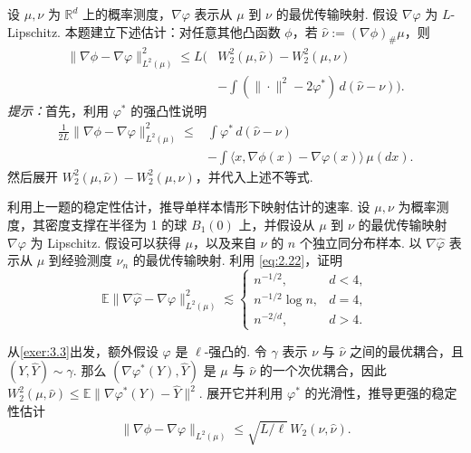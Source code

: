 \begin{exercise}\label{exer:3.3}
设 $\mu,\nu$ 为 $\mathbb R^d$ 上的概率测度，$\nabla\varphi$ 表示从 $\mu$ 到 $\nu$ 的最优传输映射. 假设 $\nabla\varphi$ 为 $L$-Lipschitz. 本题建立下述估计：对任意其他凸函数 $\phi$，若 $\widehat\nu:=(\nabla\phi)_\#\mu$，则
$$\begin{aligned}
\|\nabla\phi-\nabla\varphi\|_{L^2(\mu)}^2
\le L\biggl(&W_2^2(\mu,\widehat\nu)-W_2^2(\mu,\nu)\\
&-\int(\|\cdot\|^2-2\varphi^*)\,d(\widehat\nu-\nu)\biggr).
\end{aligned}$$
\emph{提示：}首先，利用 $\varphi^*$ 的强凸性说明
$$\begin{aligned}
\frac1{2L}\|\nabla\phi-\nabla\varphi\|_{L^2(\mu)}^2
\le{}&\int\varphi^*\,d(\widehat\nu-\nu)\\
&-\int\langle x,\nabla\phi(x)-\nabla\varphi(x)\rangle\,\mu(dx).
\end{aligned}$$
然后展开 $W_2^2(\mu,\widehat\nu)-W_2^2(\mu,\nu)$，并代入上述不等式.
\end{exercise}

\begin{exercise}\label{exer:3.4}
利用上一题的稳定性估计，推导单样本情形下映射估计的速率. 设 $\mu,\nu$ 为概率测度，其密度支撑在半径为 1 的球 $B_1(0)$ 上，并假设从 $\mu$ 到 $\nu$ 的最优传输映射 $\nabla\varphi$ 为 Lipschitz. 假设可以获得 $\mu$，以及来自 $\nu$ 的 $n$ 个独立同分布样本. 以 $\nabla\widehat\varphi$ 表示从 $\mu$ 到经验测度 $\nu_n$ 的最优传输映射. 利用 \eqref{eq:2.22}，证明
$$\mathbb E\|\nabla\widehat\varphi-\nabla\varphi\|_{L^2(\mu)}^2
\lesssim\begin{cases}n^{-1/2},&d<4,\\n^{-1/2}\log n,&d=4,\\n^{-2/d},&d>4.\end{cases}$$
\end{exercise}

\begin{exercise}\label{exer:3.5}
从\autoref{exer:3.3}出发，额外假设 $\varphi$ 是 $\ell$-强凸的. 令 $\gamma$ 表示 $\nu$ 与 $\widehat\nu$ 之间的最优耦合，且 $(Y,\widehat Y)\sim\gamma$. 那么 $(\nabla\varphi^*(Y),\widehat Y)$ 是 $\mu$ 与 $\widehat\nu$ 的一个次优耦合，因此 $W_2^2(\mu,\widehat\nu)\le\mathbb E\|\nabla\varphi^*(Y)-\widehat Y\|^2$. 展开它并利用 $\varphi^*$ 的光滑性，推导更强的稳定性估计
$$\|\nabla\phi-\nabla\varphi\|_{L^2(\mu)}\le\sqrt{L/\ell}\,W_2(\nu,\widehat\nu).$$
\end{exercise}
